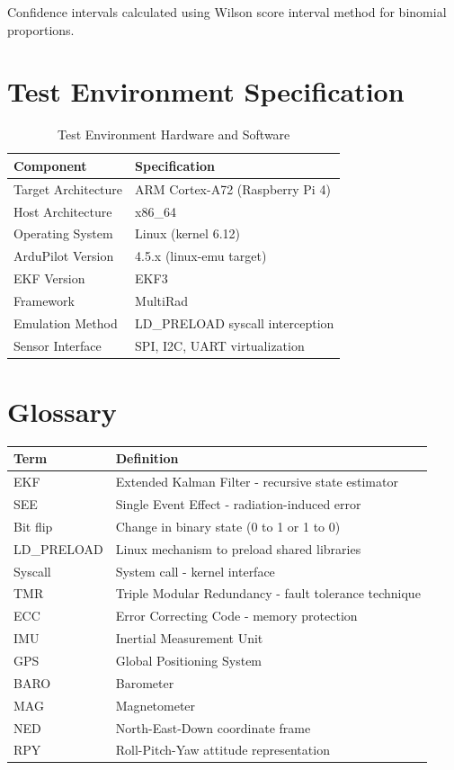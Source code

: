 \documentclass[11pt,a4paper]{article}
\begin{document}
Confidence intervals calculated using Wilson score interval method for binomial proportions.

\section{Test Environment Specification}

\begin{table}[H]
\centering
\caption{Test Environment Hardware and Software}
\label{tab:environment}
\begin{tabular}{@{}ll@{}}
\toprule
\textbf{Component} & \textbf{Specification} \\
\midrule
Target Architecture & ARM Cortex-A72 (Raspberry Pi 4) \\
Host Architecture & x86\_64 \\
Operating System & Linux (kernel 6.12) \\
ArduPilot Version & 4.5.x (linux-emu target) \\
EKF Version & EKF3 \\
Framework & MultiRad \\
Emulation Method & LD\_PRELOAD syscall interception \\
Sensor Interface & SPI, I2C, UART virtualization \\
\bottomrule
\end{tabular}
\end{table}

\section{Glossary}

\begin{table}[H]
\centering
\begin{tabular}{@{}lp{10cm}@{}}
\toprule
\textbf{Term} & \textbf{Definition} \\
\midrule
EKF & Extended Kalman Filter - recursive state estimator \\
SEE & Single Event Effect - radiation-induced error \\
Bit flip & Change in binary state (0 to 1 or 1 to 0) \\
LD\_PRELOAD & Linux mechanism to preload shared libraries \\
Syscall & System call - kernel interface \\
TMR & Triple Modular Redundancy - fault tolerance technique \\
ECC & Error Correcting Code - memory protection \\
IMU & Inertial Measurement Unit \\
GPS & Global Positioning System \\
BARO & Barometer \\
MAG & Magnetometer \\
NED & North-East-Down coordinate frame \\
RPY & Roll-Pitch-Yaw attitude representation \\
\bottomrule
\end{tabular}
\end{table}
\end{document}
